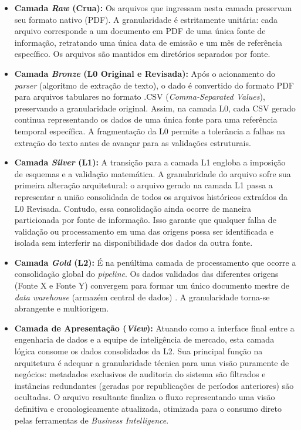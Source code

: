 \begin{itemize}
    \item \textbf{Camada \textit{Raw} (Crua):} Os arquivos que ingressam nesta camada preservam seu formato nativo (PDF). A granularidade é estritamente unitária: cada arquivo corresponde a um documento em PDF de uma única fonte de informação, retratando uma única data de emissão e um mês de referência específico. Os arquivos são mantidos em diretórios separados por fonte.
    
    \item \textbf{Camada \textit{Bronze} (L0 Original e Revisada):} Após o acionamento do \textit{parser} (algoritmo de extração de texto), o dado é convertido do formato PDF para arquivos tabulares no formato .CSV (\textit{Comma-Separated Values}), preservando a granularidade original. Assim, na camada L0, cada CSV gerado continua representando os dados de uma única fonte para uma referência temporal específica. A fragmentação da L0 permite a tolerância a falhas na extração do texto antes de avançar para as validações estruturais.
    
    \item \textbf{Camada \textit{Silver} (L1):} A transição para a camada L1 engloba a imposição de esquemas e a validação matemática. A granularidade do arquivo sofre sua primeira alteração arquitetural: o arquivo gerado na camada L1 passa a representar a união consolidada de todos os arquivos históricos extraídos da L0 Revisada. Contudo, essa consolidação ainda ocorre de maneira particionada por fonte de informação. Isso garante que qualquer falha de validação ou processamento em uma das origens possa ser identificada e isolada sem interferir na disponibilidade dos dados da outra fonte.
    
    \item \textbf{Camada \textit{Gold} (L2):} É na penúltima camada de processamento que ocorre a consolidação global do \textit{pipeline}. Os dados validados das diferentes origens (Fonte X e Fonte Y) convergem para formar um único documento mestre de \textit{data warehouse} (armazém central de dados) \cite{kimball13}. A granularidade torna-se abrangente e multiorigem. 
    
    \item \textbf{Camada de Apresentação (\textit{View}):} Atuando como a interface final entre a engenharia de dados e a equipe de inteligência de mercado, esta camada lógica consome os dados consolidados da L2. Sua principal função na arquitetura é adequar a granularidade técnica para uma visão puramente de negócios: metadados exclusivos de auditoria do sistema são filtrados e instâncias redundantes (geradas por republicações de períodos anteriores) são ocultadas. O arquivo resultante finaliza o fluxo representando uma visão definitiva e cronologicamente atualizada, otimizada para o consumo direto pelas ferramentas de \textit{Business Intelligence}.
\end{itemize}